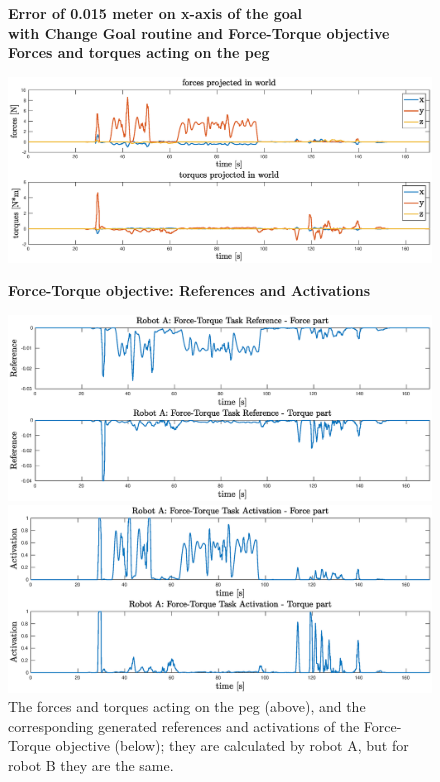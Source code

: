 \begin{figure}[H]
	\centering
	\textbf{Error of 0.015 meter on x-axis of the goal\\}
	\textbf{with Change Goal routine and Force-Torque objective}\\
	\vspace{13px}
	\textbf{Forces and torques acting on the peg\\}
	\vspace{3px}
	\centerline{ 
		\includegraphics[width=15.5cm]{error_all/force.eps}
	}
	\vspace{10px}
	\textbf{Force-Torque objective: References and Activations\\}
	\vspace{3px}
	\centerline{
		\includegraphics[width=15.5cm]{error_all/referenceForceTask.eps}
	}
	\centerline{
		\includegraphics[width=15.5cm]{error_all/activationForceTask.eps}
	}

	\caption[Plots with reference and activation of the force task]{The forces and torques acting on the peg (above), and the corresponding generated references and activations  of the Force-Torque objective (below); they are calculated by robot A, but for robot B they are the same.}
	\label{fig:forceTaskActRef}
\end{figure}

